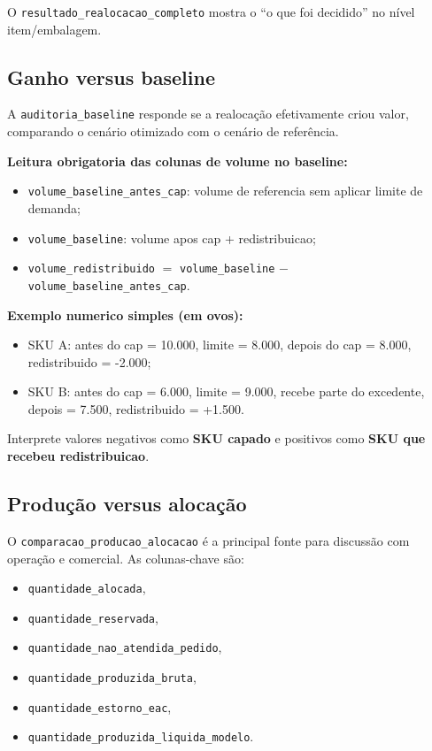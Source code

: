 \documentclass[11pt,a4paper]{article}
\begin{document}
O \texttt{resultado\_realocacao\_completo} mostra o ``o que foi decidido'' no
nível item/embalagem.

\subsection{Ganho versus baseline}

A \texttt{auditoria\_baseline} responde se a realocação efetivamente criou valor,
comparando o cenário otimizado com o cenário de referência.

\textbf{Leitura obrigatoria das colunas de volume no baseline:}
\begin{itemize}[leftmargin=1.2cm]
    \item \texttt{volume\_baseline\_antes\_cap}: volume de referencia sem aplicar limite de demanda;
    \item \texttt{volume\_baseline}: volume apos cap + redistribuicao;
    \item \texttt{volume\_redistribuido} \(=\) \texttt{volume\_baseline} \(-\) \texttt{volume\_baseline\_antes\_cap}.
\end{itemize}

\textbf{Exemplo numerico simples (em ovos):}
\begin{itemize}[leftmargin=1.2cm]
    \item SKU A: antes do cap = 10.000, limite = 8.000, depois do cap = 8.000, redistribuido = -2.000;
    \item SKU B: antes do cap = 6.000, limite = 9.000, recebe parte do excedente, depois = 7.500, redistribuido = +1.500.
\end{itemize}
Interprete valores negativos como \textbf{SKU capado} e positivos como \textbf{SKU que recebeu redistribuicao}.

\subsection{Produção versus alocação}

O \texttt{comparacao\_producao\_alocacao} é a principal fonte para discussão com
operação e comercial. As colunas-chave são:
\begin{itemize}[leftmargin=1.2cm]
    \item \texttt{quantidade\_alocada},
    \item \texttt{quantidade\_reservada},
    \item \texttt{quantidade\_nao\_atendida\_pedido},
    \item \texttt{quantidade\_produzida\_bruta},
    \item \texttt{quantidade\_estorno\_eac},
    \item \texttt{quantidade\_produzida\_liquida\_modelo}.
\end{itemize}
\end{document}
